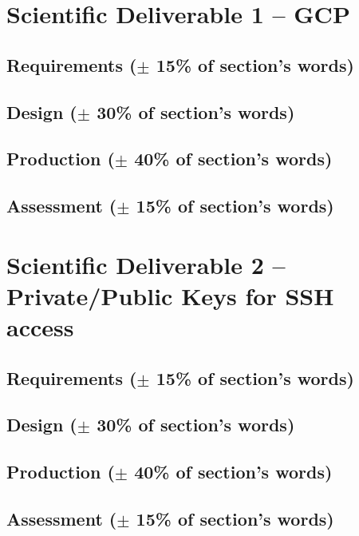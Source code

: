 \section{Scientific Deliverable 1 -- GCP}
% 
\subsection{Requirements ($\pm$ 15\% of section's words)}

\subsection{Design ($\pm$ 30\% of section's words)}

\subsection{Production ($\pm$ 40\% of section's words)}

\subsection{Assessment ($\pm$ 15\% of section's words)}


\section{Scientific Deliverable 2 -- Private/Public Keys for SSH
access}
% 
\subsection{Requirements ($\pm$ 15\% of section's words)}

\subsection{Design ($\pm$ 30\% of section's words)}

\subsection{Production ($\pm$ 40\% of section's words)}

\subsection{Assessment ($\pm$ 15\% of section's words)}


